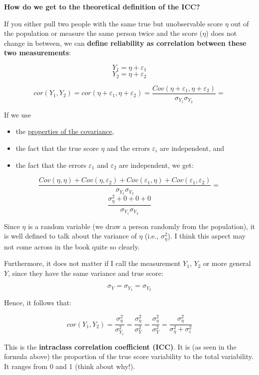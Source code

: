 \documentclass[
]{book}
\providecommand{\tightlist}{%
  \setlength{\itemsep}{0pt}\setlength{\parskip}{0pt}}
\begin{document}
\textbf{How do we get to the theoretical definition of the ICC?}

If you either pull two people with the same true but unobservable score \(\eta\) out of the population
or measure the same person twice and the score (\(\eta\)) does not change in between, we can
\textbf{define reliability as correlation between these two measurements}:

\[Y_1 = \eta + \varepsilon_1\]
\[Y_2 = \eta + \varepsilon_2\]

\[cor(Y_1, Y_2) = cor(\eta + \varepsilon_1, \eta + \varepsilon_2) = \frac{Cov(\eta + \varepsilon_1, \eta + \varepsilon_2)}{\sigma_{Y_1}\sigma_{Y_2}}  =\]

If we use

\begin{itemize}
\tightlist
\item
  the \href{https://en.wikipedia.org/wiki/Covariance\#Properties}{properties of the covariance},
\item
  the fact that the true score \(\eta\) and the errors \(\varepsilon_i\) are independent, and
\item
  the fact that the errors \(\varepsilon_1\) and \(\varepsilon_2\) are independent, we get:
\end{itemize}

\[\frac{Cov(\eta, \eta) + Cov(\eta, \varepsilon_2) + Cov(\varepsilon_1, \eta) + Cov(\varepsilon_1, \varepsilon_2)}{\sigma_{Y_1} \sigma_{Y_2}}  =\]
\[\frac{\sigma_{\eta}^2 + 0 + 0 + 0}{\sigma_{Y_1} \sigma_{Y_2}}\]

Since \(\eta\) is a random variable (we draw a person randomly from the population),
it is well defined to talk about the variance of \(\eta\) (i.e., \(\sigma_{\eta}^2\)).
I think this aspect may not come across in the book quite so clearly.

Furthermore, it does not matter if I call the measurement \(Y_1\), \(Y_2\) or more general
\(Y\), since they have the same variance and true score:

\[\sigma_{Y} = \sigma_{Y_1} = \sigma_{Y_2}\]

Hence, it follows that:

\[cor(Y_1, Y_2) = \frac{\sigma_{\eta}^2}{\sigma_{Y_1}^2} = \frac{\sigma_{\eta}^2}{\sigma_{Y}^2} =  \frac{\sigma_{\eta}^2}{\sigma_{Y}^2} = \frac{\sigma_{\eta}^2}{\sigma_{\eta}^2 + \sigma_{\varepsilon}^2}\]

This is the \textbf{intraclass correlation coefficient (ICC)}.
It is (as seen in the formula above) the proportion of the
true score variability to the total variability.
It ranges from 0 and 1 (think about why!).
\end{document}
